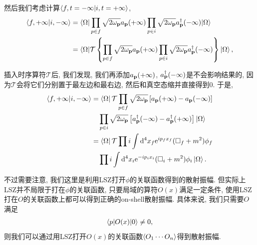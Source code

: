 然后我们考虑计算$\braket{f, t=-\infty|i, t=+\infty}$, 
\begin{align}
    \braket{f, +\infty|i, -\infty}&=\braket{\Omega|\prod_{p\in f}\sqrt{2\omega_{\mathbf{p}}}a_{\mathbf{p}}(+\infty)\prod_{p\in i}\sqrt{2\omega_{\mathbf{p}}}a_{\mathbf{p}}^\dagger(-\infty)|\Omega}\\
    &=\braket{\Omega|\mathcal T\left\{{\prod_{p\in f}\sqrt{2\omega_{\mathbf{p}}}a_{\mathbf{p}}(+\infty)\prod_{p\in i}\sqrt{2\omega_{\mathbf{p}}}a_{\mathbf{p}}^\dagger(-\infty)}\right\}|\Omega},
\end{align}

插入时序算符$\mathcal T$后, 我们发现, 我们再添加$a_{\mathbf{p}}(+\infty)$, $a_{\mathbf{p}}^\dagger(-\infty)$是不会影响结果的, 因为$\mathcal T$会将它们分别置于最左边和最右边, 然后和真空态缩并直接得到0. 于是,
\begin{align}
    \braket{f, +\infty|i, -\infty}&=\bra{\Omega}\mathcal T\prod_{p\in f}\sqrt{2\omega_{\mathbf{p}}}\left[a_{\mathbf{p}}(+\infty)-a_{\mathbf{p}}(-\infty)\right]\notag\\
    &\quad\prod_{p\in i}\sqrt{2\omega_{\mathbf{p}}}\left[a_{\mathbf{p}}^\dagger(-\infty)-a_{\mathbf{p}}^\dagger(+\infty)\right]\ket{\Omega}\notag\\
    &=\bra{\Omega}\mathcal T\prod i\int\mathrm d^4x_f\mathrm e^{ip_fx_f}(\Box_f+m^2)\phi_f\notag\\
    &\quad\prod i\int\mathrm d^4x_i\mathrm e^{-ip_ix_i}(\Box_i+m^2)\phi_i\ket{\Omega}.\label{LSZ-final-inside}
\end{align}

不过需要注意, 我们这里是利用LSZ打开$\phi$的关联函数得到的散射振幅. 但实际上LSZ并不局限于打在$\phi$的关联函数, 只要局域的算符$O(x)$满足一定条件, 使用LSZ打在$O$的关联函数上都可以得到正确的on-shell散射振幅. 具体来说, 我们只需要$O$满足
\begin{align}
    \braket{p|O(x)|0}\neq0,
\end{align}
则我们可以通过用LSZ打开$O(x)$的关联函数$\braket{O_1\cdots O_n}$得到散射振幅.

